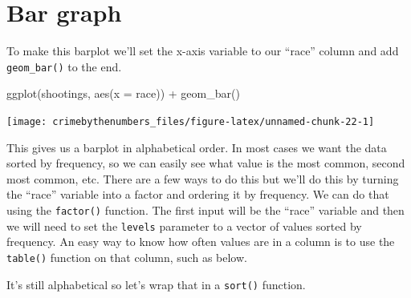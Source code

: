 \documentclass[
]{krantz}
\makeatletter
\newenvironment{Shaded}{\begin{snugshade}}{\end{snugshade}}
\newcommand{\AttributeTok}[1]{\textcolor[rgb]{0.61,0.61,0.61}{#1}}
\newcommand{\CommentTok}[1]{\textcolor[rgb]{0.37,0.37,0.37}{\textit{#1}}}
\newcommand{\FunctionTok}[1]{\textcolor[rgb]{0,0,0}{#1}}
\newcommand{\NormalTok}[1]{#1}
\newcommand{\SpecialCharTok}[1]{\textcolor[rgb]{0,0,0}{#1}}
\newenvironment{kframe}{%
\medskip{}
\setlength{\fboxsep}{.8em}
 \def\at@end@of@kframe{}%
 \ifinner\ifhmode%
  \def\at@end@of@kframe{\end{minipage}}%
  \begin{minipage}{\columnwidth}%
 \fi\fi%
 \def\FrameCommand##1{\hskip\@totalleftmargin \hskip-\fboxsep
 \colorbox{shadecolor}{##1}\hskip-\fboxsep
     \hskip-\linewidth \hskip-\@totalleftmargin \hskip\columnwidth}%
 \MakeFramed {\advance\hsize-\width
   \@totalleftmargin\z@ \linewidth\hsize
   \@setminipage}}%
 {\par\unskip\endMakeFramed%
 \at@end@of@kframe}
\renewenvironment{Shaded}{\begin{kframe}}{\end{kframe}}
\makeatother
\begin{document}
\hypertarget{bar-graph}{%
\section{Bar graph}\label{bar-graph}}

To make this barplot we'll set the x-axis variable to our ``race'' column and add \texttt{geom\_bar()} to the end.

\begin{Shaded}
\begin{Highlighting}[]
\FunctionTok{ggplot}\NormalTok{(shootings, }\FunctionTok{aes}\NormalTok{(}\AttributeTok{x =}\NormalTok{ race)) }\SpecialCharTok{+} \FunctionTok{geom\_bar}\NormalTok{()}
\end{Highlighting}
\end{Shaded}

\begin{center}\texttt{[image: crimebythenumbers\_files/figure-latex/unnamed-chunk-22-1]} \end{center}

This gives us a barplot in alphabetical order. In most cases we want the data sorted by frequency, so we can easily see what value is the most common, second most common, etc. There are a few ways to do this but we'll do this by turning the ``race'' variable into a factor and ordering it by frequency. We can do that using the \texttt{factor()} function. The first input will be the ``race'' variable and then we will need to set the \texttt{levels} parameter to a vector of values sorted by frequency. An easy way to know how often values are in a column is to use the \texttt{table()} function on that column, such as below.

\begin{Shaded}
\end{Shaded}

It's still alphabetical so let's wrap that in a \texttt{sort()} function.

\begin{Shaded}
\end{Shaded}
\end{document}
